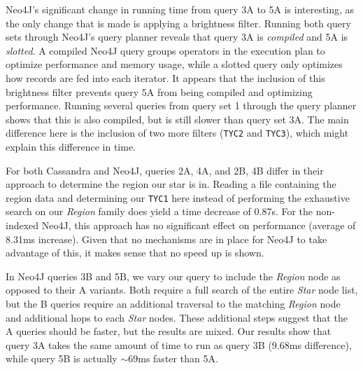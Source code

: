 Neo4J's significant change in running time from query 3A to 5A is interesting, as the only change that is made is
applying a brightness filter.
Running both query sets through Neo4J's query planner reveals that query 3A is \textit{compiled} and 5A is
\textit{slotted}.
A compiled Neo4J query groups operators in the execution plan to optimize performance and memory usage, while a
slotted query only optimizes how records are fed into each iterator.
It appears that the inclusion of this brightness filter prevents query 5A from being compiled and optimizing
performance.
Running several queries from query set 1 through the query planner shows that this is also compiled, but is still
slower than query set 3A\@.
The main difference here is the inclusion of two more filters (\texttt{TYC2} and \texttt{TYC3}), which might explain
this difference in time.

For both Cassandra and Neo4J, queries 2A, 4A, and 2B, 4B differ in their approach to determine the region our star is
in.
Reading a file containing the region data and determining our \texttt{TYC1} here instead of performing the exhaustive
search on our \textit{Region} family does yield a time decrease of 0.87s.
For the non-indexed Neo4J, this approach has no significant effect on performance (average of 8.31ms increase).
Given that no mechanisms are in place for Neo4J to take advantage of this, it makes sense that no speed up is shown.

In Neo4J queries 3B and 5B, we vary our query to include the \textit{Region} node as opposed to their A variants.
Both require a full search of the entire \textit{Star} node list, but the B queries require an additional traversal
to the matching \textit{Region} node and additional hops to each \textit{Star} nodes.
These additional steps suggest that the A queries should be faster, but the results are mixed.
Our results show that query 3A takes the same amount of time to run as query 3B (9.68ms difference), while query 5B
is actually $\sim$69ms faster than 5A\@.


